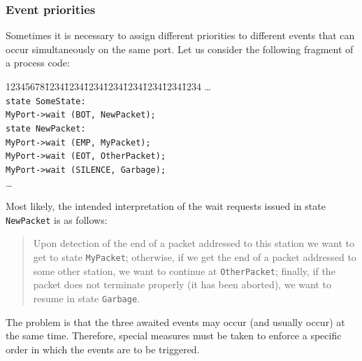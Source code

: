\subsubsection{Event priorities}
\label{rm_po_wr_ep}

Sometimes it is necessary to assign different priorities to different
events that can occur simultaneously on the same port.
Let us consider the following fragment of a process code:
{\tt\begin{tabbing}
12345678\=1234\=1234\=1234\=1234\=1234\=1234\=1234\=1234\kill
\> \ldots \\
\> {\tt state SomeState:}\\
\> \> {\tt MyPort->wait (BOT, NewPacket);}\\
\> {\tt state NewPacket:}\\
\> \> {\tt MyPort->wait (EMP, MyPacket);}\\
\> \> {\tt MyPort->wait (EOT, OtherPacket);}\\
\> \> {\tt MyPort->wait (SILENCE, Garbage);}\\
\> \ldots
\end{tabbing}}
Most likely, the intended interpretation of the wait requests issued
in state {\tt NewPacket} is as follows:

\begin{quote}
Upon detection of the end
of a packet addressed to this station we want to get to state
{\tt MyPacket}; otherwise, if we get the end of a packet addressed
to some other station, we want to continue at {\tt OtherPacket}; finally,
if the packet does not terminate properly (it has been aborted),
we want to resume in state {\tt Garbage}.
\end{quote}

The problem is that the three awaited events may occur (and
usually occur) at the same time.
Therefore, special measures must be taken to enforce a specific order in which
the events are to be triggered.

